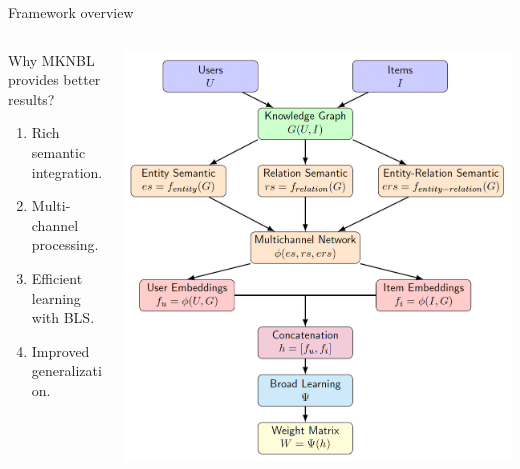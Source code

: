 \documentclass[11pt,pdf,hyperref={unicode}]{beamer}
\begin{document}
    \begin{frame}{Framework overview}
        \begin{columns}
            \begin{column}{0.35\textwidth}
                Why MKNBL provides better results?
                \begin{enumerate}
                    \item Rich semantic integration.
                    \item Multi-channel processing.
                    \item Efficient learning with BLS.
                    \item Improved generalization.
                \end{enumerate}
            \end{column}
            \begin{column}{0.7\textwidth}
                \includegraphics[width=1.0\textwidth]{Kirill-Shevchenko-Step-3-fig}      
            \end{column}
        \end{columns}
    \end{frame}
\end{document}
